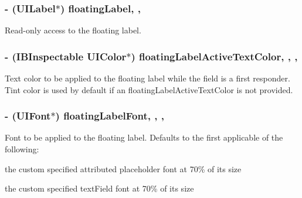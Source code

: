 \subsubsection[{floating\+Label}]{\setlength{\rightskip}{0pt plus 5cm}-\/ (U\+I\+Label$\ast$) floating\+Label\hspace{0.3cm}{\ttfamily [read]}, {\ttfamily [nonatomic]}, {\ttfamily [strong]}}\label{interface_j_v_float_labeled_text_field_a63571476c8d5dbbd4103a644d0d060b7}
Read-\/only access to the floating label. \hypertarget{interface_j_v_float_labeled_text_field_aa64fbb90cafa476f2fa52eb8a8875aa1}{}
\subsubsection[{floating\+Label\+Active\+Text\+Color}]{\setlength{\rightskip}{0pt plus 5cm}-\/ (I\+B\+Inspectable U\+I\+Color$\ast$) floating\+Label\+Active\+Text\+Color\hspace{0.3cm}{\ttfamily [read]}, {\ttfamily [write]}, {\ttfamily [nonatomic]}, {\ttfamily [strong]}}\label{interface_j_v_float_labeled_text_field_aa64fbb90cafa476f2fa52eb8a8875aa1}
Text color to be applied to the floating label while the field is a first responder. Tint color is used by default if an {\ttfamily floating\+Label\+Active\+Text\+Color} is not provided. \hypertarget{interface_j_v_float_labeled_text_field_aa1d2ea55ded3f079d09ee35d34a1b8ea}{}
\subsubsection[{floating\+Label\+Font}]{\setlength{\rightskip}{0pt plus 5cm}-\/ (U\+I\+Font$\ast$) floating\+Label\+Font\hspace{0.3cm}{\ttfamily [read]}, {\ttfamily [write]}, {\ttfamily [nonatomic]}, {\ttfamily [strong]}}\label{interface_j_v_float_labeled_text_field_aa1d2ea55ded3f079d09ee35d34a1b8ea}
Font to be applied to the floating label. Defaults to the first applicable of the following\+:
\begin{DoxyItemize}
\item the custom specified attributed placeholder font at 70\% of its size
\item the custom specified text\+Field font at 70\% of its size 
\end{DoxyItemize}\hypertarget{interface_j_v_float_labeled_text_field_a22466509e0b40b1a7a24aa17d949b79b}{}
